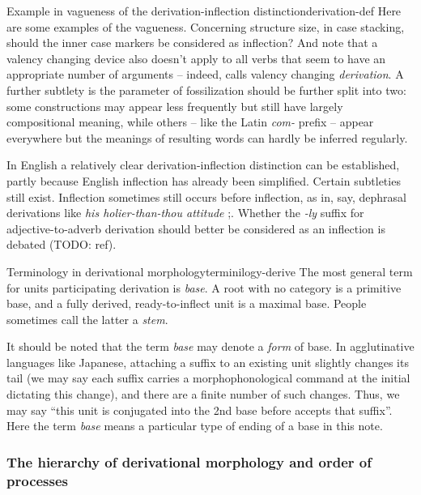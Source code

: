 \documentclass[UTF8, a4paper, oneside, scheme=plain]{ctexrep}
\newcommand*{\citepage}[1]{p.~{#1}}
\newcommand*{\term}[1]{\emph{#1}}
\newcommand{\corpus}[1]{\emph{#1}}
\begin{document}
\begin{infobox}{Example in vagueness of the derivation-inflection distinction}{derivation-def}
    Here are some examples of the vagueness.
    Concerning structure size, in case stacking, 
    should the inner case markers be considered as inflection?
    And note that a valency changing device also doesn't apply to all verbs that seem to have 
    an appropriate number of arguments --
    indeed, \citet{jacques2021grammar} calls valency changing \term{derivation}.
    A further subtlety is the parameter of fossilization should be further split into two:
    some constructions may appear less frequently but still have largely compositional meaning,
    while others -- like the Latin \corpus{com-} prefix -- 
    appear everywhere but the meanings of resulting words
    can hardly be inferred regularly.
\end{infobox}

In English a relatively clear derivation-inflection distinction can be established,
partly because English inflection has already been simplified.
Certain subtleties still exist.
Inflection sometimes still occurs before inflection,
as in, say, dephrasal derivations like \corpus{his holier-than-thou attitude} \citep[\citepage{1646}]{cgel};.
Whether the \corpus{-ly} suffix for adjective-to-adverb derivation 
should better be considered as an inflection is debated (TODO: ref).

\begin{infobox}{Terminology in derivational morphology}{terminilogy-derive}
    The most general term for units participating derivation is \term{base}.
    A root with no category is a primitive base,
    and a fully derived, ready-to-inflect unit is a maximal base.
    People sometimes call the latter a \term{stem}.

    It should be noted that the term \term{base} may denote a \emph{form} of base.
    In agglutinative languages like Japanese,
    attaching a suffix to an existing unit slightly changes its tail
    (we may say each suffix carries a morphophonological command at the initial
    dictating this change),
    and there are a finite number of such changes.
    Thus, we may say ``this unit is conjugated into the 2nd base before accepts that suffix''.
    Here the term \term{base} means a particular type of ending 
    of a base in this note.
\end{infobox}

\subsubsection{The hierarchy of derivational morphology and order of processes}
\end{document}
